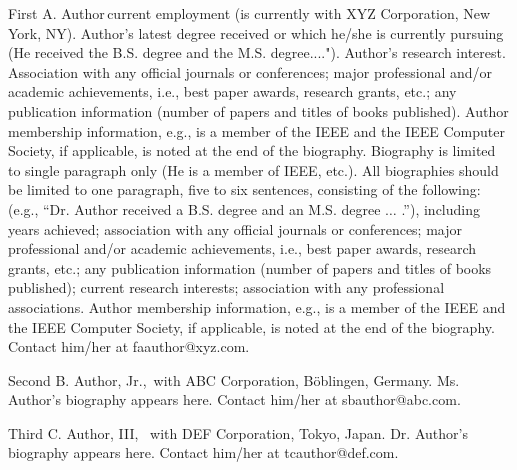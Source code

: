 \documentclass{IEEEcsmag}
\begin{document}
\begin{IEEEbiography}{First A. Author}{\,}current employment (is currently with XYZ Corporation, New York, NY). Author's latest degree received or which he/she is currently pursuing (He received the B.S. degree and the M.S. degree...."). Author's research interest. Association with any official journals or conferences; major professional and/or academic achievements, i.e., best paper awards, research grants, etc.; any publication information (number of papers and titles of books published). Author membership information, e.g., is a member of the IEEE and the IEEE Computer Society, if applicable, is noted at the end of the biography. Biography is limited to single paragraph only (He is a member of IEEE, etc.). All biographies should be limited to one paragraph, five to six sentences, consisting of the following: (e.g., ``Dr. Author received a B.S. degree and an M.S. degree $\ldots$ .''), including years achieved; association with any official journals or conferences; major professional and/or academic achievements, i.e., best paper awards, research grants, etc.; any publication information (number of papers and titles of books published); current research interests; association with any professional associations. Author membership information, e.g., is a member of the IEEE and the IEEE Computer Society, if applicable, is noted at the end of the biography. Contact him/her at faauthor@xyz.com.\vfill\pagebreak
\end{IEEEbiography}

\begin{IEEEbiography}{Second B. Author, Jr.,}{\,} with ABC Corporation, Böblingen, Germany. Ms. Author’s biography appears here.  Contact him/her at sbauthor@abc.com.
\end{IEEEbiography}

\begin{IEEEbiography}{Third C. Author, III,} {\,} with DEF Corporation, Tokyo, Japan. Dr. Author’s biography appears here.  Contact him/her at tcauthor@def.com.
\end{IEEEbiography}
\end{document}

